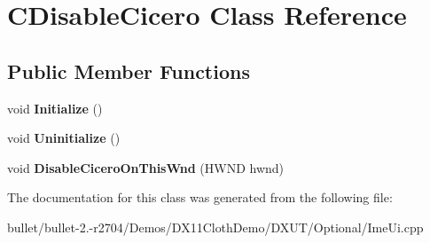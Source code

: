\hypertarget{class_c_disable_cicero}{\section{C\+Disable\+Cicero Class Reference}
\label{class_c_disable_cicero}
}
\subsection*{Public Member Functions}
\begin{DoxyCompactItemize}
\item 
\hypertarget{class_c_disable_cicero_a4a317cc8adad152fcafb174953b1686c}{void {\bfseries Initialize} ()}\label{class_c_disable_cicero_a4a317cc8adad152fcafb174953b1686c}

\item 
\hypertarget{class_c_disable_cicero_a69ab6f18e6d85be596174bc4819855b7}{void {\bfseries Uninitialize} ()}\label{class_c_disable_cicero_a69ab6f18e6d85be596174bc4819855b7}

\item 
\hypertarget{class_c_disable_cicero_aeda61d6f8db3cedb4b8ae51683953a6f}{void {\bfseries Disable\+Cicero\+On\+This\+Wnd} (H\+W\+N\+D hwnd)}\label{class_c_disable_cicero_aeda61d6f8db3cedb4b8ae51683953a6f}

\end{DoxyCompactItemize}


The documentation for this class was generated from the following file\+:\begin{DoxyCompactItemize}
\item 
bullet/bullet-\/2.-\/r2704/\+Demos/\+D\+X11\+Cloth\+Demo/\+D\+X\+U\+T/\+Optional/Ime\+Ui.\+cpp\end{DoxyCompactItemize}
